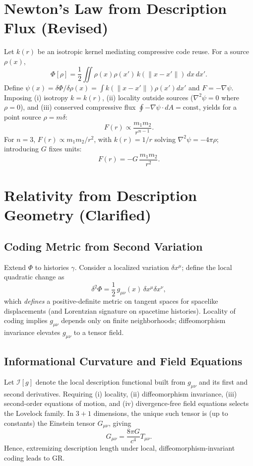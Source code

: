 \documentclass[aps,preprint,onecolumn,longbibliography,nofootinbib]{revtex4-2}
\numberwithin{equation}{section}
\begin{document}
\section{Newton's Law from Description Flux (Revised)}
Let $k(r)$ be an isotropic kernel mediating compressive code reuse. For a source $\rho(x)$,
\begin{equation}
\Phi[\rho] = \frac12\iint \rho(x)\rho(x')\,k(\|x-x'\|)\,dx\,dx'. \label{eq:pair}
\end{equation}
Define $\psi(x)=\delta\Phi/\delta\rho(x)=\int k(\|x-x'\|)\rho(x')dx'$ and $F=-\nabla\psi$. Imposing (i) isotropy $k=k(r)$, (ii) locality outside sources ($\nabla^2\psi=0$ where $\rho=0$), and (iii) conserved compressive flux $\oint -\nabla\psi\cdot dA=\text{const}$, yields for a point source $\rho=m\delta$:
\begin{equation}
F(r) \propto \frac{m_1 m_2}{r^{n-1}}. \label{eq:dimlaw}
\end{equation}
For $n=3$, $F(r)\propto m_1m_2/r^2$, with $k(r)=1/r$ solving $\nabla^2\psi=-4\pi\rho$; introducing $G$ fixes units:
\begin{equation}
F(r) = -G\,\frac{m_1m_2}{r^2}. \label{eq:newton}
\end{equation}

\section{Relativity from Description Geometry (Clarified)}
\subsection{Coding Metric from Second Variation}\label{sec:metric}
Extend $\Phi$ to histories $\gamma$. Consider a localized variation $\delta x^\mu$; define the local quadratic change as
\begin{equation}
\delta^2 \Phi = \frac12\, g_{\mu\nu}(x)\,\delta x^\mu \delta x^\nu, \label{eq:2ndvar}
\end{equation}
which \emph{defines} a positive-definite metric on tangent spaces for spacelike displacements (and Lorentzian signature on spacetime histories). Locality of coding implies $g_{\mu\nu}$ depends only on finite neighborhoods; diffeomorphism invariance elevates $g_{\mu\nu}$ to a tensor field.

\subsection{Informational Curvature and Field Equations}
Let $\mathcal{I}[g]$ denote the local description functional built from $g_{\mu\nu}$ and its first and second derivatives. Requiring (i) locality, (ii) diffeomorphism invariance, (iii) second-order equations of motion, and (iv) divergence-free field equations selects the Lovelock family. In $3{+}1$ dimensions, the unique such tensor is (up to constants) the Einstein tensor $G_{\mu\nu}$, giving
\begin{equation}
G_{\mu\nu}=\frac{8\pi G}{c^4}T_{\mu\nu}. \label{eq:einstein}
\end{equation}
Hence, extremizing description length under local, diffeomorphism-invariant coding leads to GR.
\end{document}
